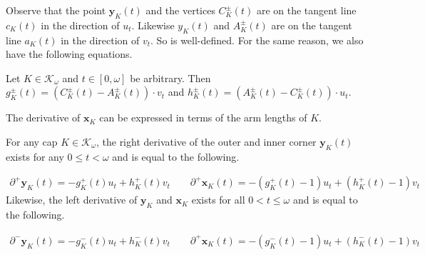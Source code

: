 Observe that the point \(\mathbf{y}_K(t)\) and the vertices \(C_K^{\pm}(t)\) are on the tangent line \(c_K(t)\) in the direction of \(u_t\). Likewise \(y_K(t)\) and \(A_K^{\pm}(t)\) are on the tangent line \(a_K(t)\) in the direction of \(v_t\). So  is well-defined. For the same reason, we also have the following equations.

\begin{proposition}

Let \(K \in \mathcal{K}_\omega\) and \(t \in [0, \omega]\) be arbitrary. Then \(g_K^{\pm}(t) = \left( C_K^{\pm}(t) - A_K^{\pm}(t) \right) \cdot v_t\) and \(h_K^{\pm}(t) = (A_K^{\pm}(t) - C_K^{\pm}(t)) \cdot u_t\).

\label{pro:cap-tangent-arm-length}
\end{proposition}

The derivative of \(\mathbf{x}_K\) can be expressed in terms of the arm lengths of \(K\).

\begin{theorem}

For any cap \(K \in \mathcal{K}_\omega\), the right derivative of the outer and inner corner \(\mathbf{y}_K(t)\) exists for any \(0 \leq t < \omega\) and is equal to the following.

\begin{align*}
\partial^+ \mathbf{y}_K(t) = -g_K^+(t) u_t + h_K^+(t) v_t \qquad \partial^+ \mathbf{x}_K(t) = -(g_K^+(t) - 1) u_t + (h_K^+(t) - 1) v_t
\end{align*}
Likewise, the left derivative of \(\mathbf{y}_K\) and \(\mathbf{x}_K\) exists for all \(0 < t \leq \omega\) and is equal to the following.

\begin{align*}
\partial^- \mathbf{y}_K(t) = -g_K^-(t) u_t + h_K^-(t) v_t \qquad \partial^+ \mathbf{x}_K(t) = -(g_K^-(t) - 1) u_t + (h_K^-(t) - 1) v_t
\end{align*}

\label{thm:inner-corner-deriv}
\end{theorem}

